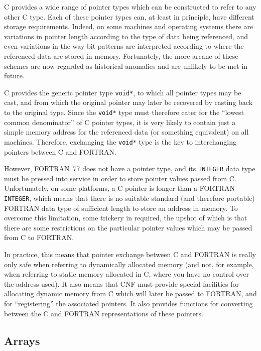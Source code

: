 \documentclass[twoside,11pt,nolof]{starlink}
\begin{document}
C provides a wide range of pointer types which can be constructed to
refer to any other C type. Each of these pointer types can, at least
in principle, have different storage requirements. Indeed, on some
machines and operating systems there are variations in pointer length
according to the type of data being referenced, and even variations in
the way bit patterns are interpreted according to where the referenced
data are stored in memory. Fortunately, the more arcane of these
schemes are now regarded as historical anomalies and are unlikely to
be met in future.

C provides the generic pointer type \texttt{void*}, to which all
pointer types may be cast, and from which the original pointer may
later be recovered by casting back to the original type. Since the
\texttt{void*} type must therefore cater for the ``lowest common
denominator'' of C pointer types, it is very likely to contain just a
simple memory address for the referenced data (or something
equivalent) on all machines. Therefore, exchanging the \texttt{void*}
type is the key to interchanging pointers between C and FORTRAN.

However, FORTRAN~77 does not have a pointer type, and its
\texttt{INTEGER} data type must be pressed into service in order to
store pointer values passed from C. Unfortunately, on some platforms,
a C pointer is longer than a FORTRAN \texttt{INTEGER}, which means
that there is no suitable standard (and therefore portable) FORTRAN
data type of sufficient length to store an address in memory. To
overcome this limitation, some trickery in required, the upshot of
which is that there are some restrictions on the particular pointer
values which may be passed from C to FORTRAN.

In practice, this means that pointer exchange between C and FORTRAN is
really only safe when referring to dynamically allocated memory (and
not, for example, when referring to static memory allocated in C,
where you have no control over the address used). It also means that
CNF must provide special facilities for allocating dynamic memory from
C which will later be passed to FORTRAN, and for ``registering'' the
associated pointers. It also provides functions for converting between
the C and FORTRAN representations of these pointers.

\subsection{Arrays}
\end{document}
